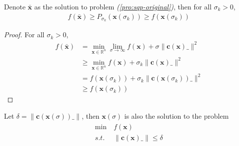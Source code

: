 \begin{lemma}
    Denote $\bar{\mathbf{x}}$ as the solution to
    problem \emph{(\ref{pro:sqp-original})}, then for all
    $\sigma_k>0$,
    \begin{align}
        f(\bar{\mathbf{x}}) \geq
        P_{\sigma_k}(\mathbf{x}(\sigma_k))
        \geq f(\mathbf{x}(\sigma_k))
    \end{align}
\end{lemma}
\begin{proof}
    For all $\sigma_k>0$,
    \begin{align}
        f(\bar{\mathbf{x}}) &= 
        \min_{\mathbf{x} \in \mathbb{R}^n}
        \lim_{\sigma \rightarrow \infty}
        f(\mathbf{x}) + \sigma \parallel \mathbf{c}
        (\mathbf{x})\_ \parallel^2 \\
        &\geq \min_{\mathbf{x} \in \mathbb{R}^n}
        f(\mathbf{x}) + \sigma_k \parallel \mathbf{c}
        (\mathbf{x})\_ \parallel^2\\
        &= f(\mathbf{x}(\sigma_k)) + \sigma_k \parallel \mathbf{c}
        (\mathbf{x}(\sigma_{k}))\_ \parallel^2 \\
        &\geq f(\mathbf{x}(\sigma_k))
    \end{align}
    
\end{proof}
\begin{lemma}
    Let $\delta = \parallel \mathbf{c}
    (\mathbf{x}(\sigma))\_ \parallel$,
    then $\mathbf{x}(\sigma)$ is also
    the solution to the problem
    \begin{align}
        \begin{array}{ll}
            \min \ &f(\mathbf{x}) \\
            s.t. \ &\parallel \mathbf{c}
            (\mathbf{x})\_ \parallel \leq \delta
        \end{array}
    \end{align}
\end{lemma}
